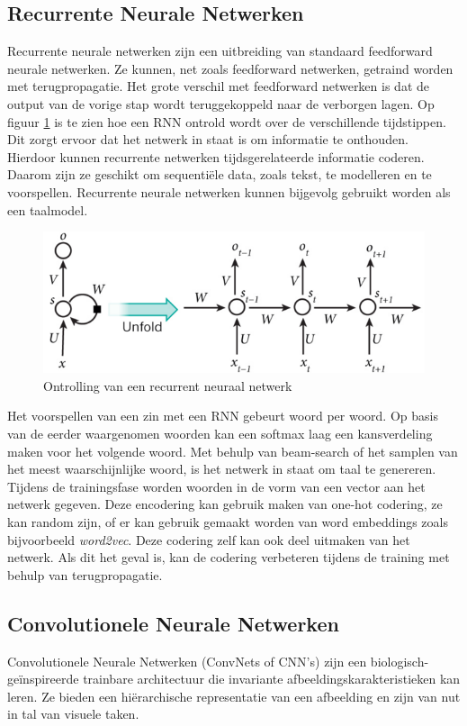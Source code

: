 \subsection{Recurrente Neurale Netwerken}
Recurrente neurale netwerken zijn een uitbreiding van standaard feedforward neurale netwerken. Ze kunnen, net zoals feedforward netwerken, getraind worden met terugpropagatie. Het grote verschil met feedforward netwerken is dat de output van de vorige stap wordt teruggekoppeld naar de verborgen lagen. Op figuur \ref{fig:rnn} is te zien hoe een RNN ontrold wordt over de verschillende tijdstippen. Dit zorgt ervoor dat het netwerk in staat is om informatie te onthouden. Hierdoor kunnen recurrente netwerken tijdsgerelateerde informatie coderen. Daarom zijn ze geschikt om sequenti\"ele data, zoals tekst, te modelleren en te voorspellen. Recurrente neurale netwerken kunnen bijgevolg gebruikt worden als een taalmodel.

\begin{figure}[tb]
    \centering
    \includegraphics[width=\linewidth]{Images/rnn.PNG}
    \caption{Ontrolling van een recurrent neuraal netwerk}
    \label{fig:rnn}
\end{figure}

Het voorspellen van een zin met een RNN gebeurt woord per woord. Op basis van de eerder waargenomen woorden kan een softmax laag een kansverdeling maken voor het volgende woord. Met behulp van beam-search of het samplen van het meest waarschijnlijke woord, is het netwerk in staat om taal te genereren. Tijdens de trainingsfase worden woorden in de vorm van een vector aan het netwerk gegeven. Deze encodering kan gebruik maken van one-hot codering, ze kan random zijn, of er kan gebruik gemaakt worden van word embeddings zoals bijvoorbeeld \emph{word2vec}\cite{Mikolov2013}. Deze codering zelf kan ook deel uitmaken van het netwerk. Als dit het geval is, kan de codering verbeteren tijdens de training met behulp van terugpropagatie.

\subsection{Convolutionele Neurale Netwerken}
\label{sec:CNN}
Convolutionele Neurale Netwerken (ConvNets of CNN's) zijn een biologisch- ge\" inspireerde trainbare architectuur die invariante afbeeldingskarakteristieken kan leren. \cite{LeCun2010} Ze bieden een hi\"erarchische representatie van een afbeelding en zijn van nut in tal van visuele taken.\cite{Girshick2014}\cite{ciresan2012multi}\cite{lawrence1997face}

